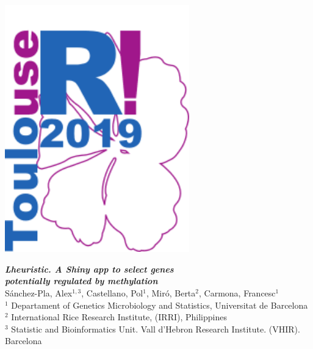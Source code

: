 
\colorbox{qmuldarkblue}{
 \color{white}
 
\begin{minipage}{0.2\textwidth}
\begin{center}
 \vskip 1cm
	
  \includegraphics[width=8cm]{images/useRToulouse.png}

     \end{center}
     
\end{minipage}


\begin{minipage}{0.6\textwidth}
\vspace*{0.4cm}
\begin{center}
   \textrm
   {
    {\huge \bf \em Lheuristic. A Shiny app to select genes \\ potentially regulated by methylation}\\[1ex]
    {\large Sánchez-Pla, Alex$^{1,3}$, Castellano, Pol$^1$,  Mir\'{o}, Berta$^2$, Carmona, Francesc$^1$}\\[1ex]
    {\large $^1$ Departament of Genetics Microbiology and Statistics, Universitat de Barcelona\\
    $^2$ International Rice Research Institute, (IRRI), Philippines\\
    $^3$ Statistic and Bioinformatics Unit. Vall d'Hebron Research Institute.  (VHIR). Barcelona}
   }
   \end{center}
   

\end{minipage}}
